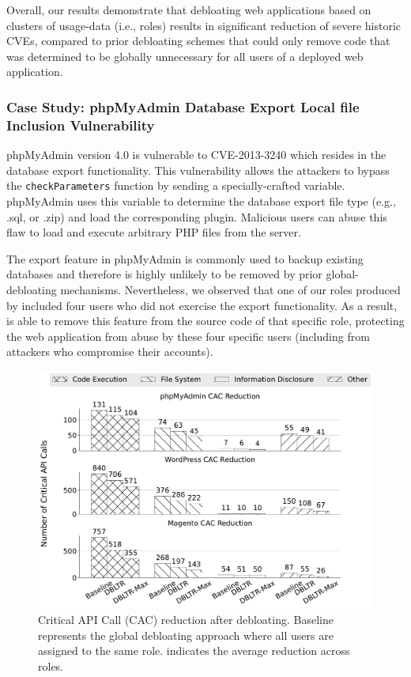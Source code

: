 Overall, our results demonstrate that debloating web applications based on clusters of usage-data (i.e., roles) results in significant reduction of severe historic CVEs, compared to prior debloating schemes that could only remove code that was determined to be globally unnecessary for all users of a deployed web application.

\subsubsection{Case Study: phpMyAdmin Database Export Local file Inclusion Vulnerability}

phpMyAdmin version 4.0 is vulnerable to CVE-2013-3240 which resides in the database export functionality. 
This vulnerability allows the attackers to bypass the \texttt{checkParameters} function by sending a specially-crafted variable. 
phpMyAdmin uses this variable to determine the database export file type (e.g., .sql, or .zip) and load the corresponding plugin. 
Malicious users can abuse this flaw to load and execute arbitrary PHP files from the server. 

The export feature in phpMyAdmin is commonly used to backup existing databases and therefore is highly unlikely to be removed by prior global-debloating mechanisms.
Nevertheless, we observed that one of our roles produced by \dbltr{} included four users who did not exercise the export functionality. As a result, \dbltr{} is able to remove this feature from the source code of that specific role, protecting the web application from abuse by these four specific users (including from attackers who compromise their accounts). 

\begin{figure}[t]
    \centering
    \includegraphics[width=\linewidth]{figures/dbltr/cac_reduction_spectral_bw.pdf}
    \caption{Critical API Call (CAC) reduction after debloating. Baseline represents the global debloating approach where all users are assigned to the same role. \dbltr{} indicates the average reduction across roles.}
    \label{fig:cac_reduction}
\end{figure}

